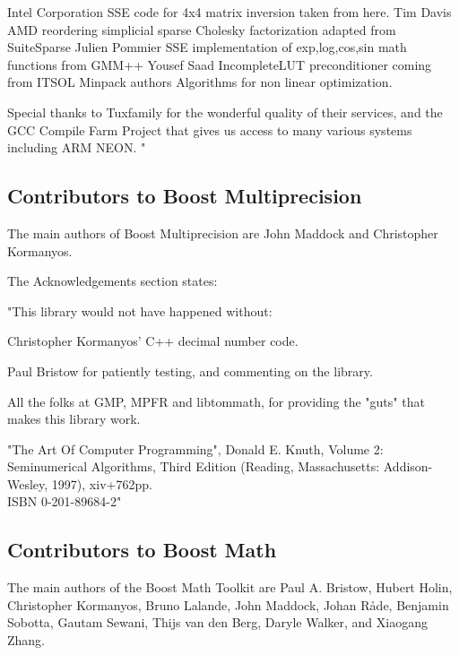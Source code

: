 \vpara
Intel Corporation  SSE code for 4x4 matrix inversion taken from here.  
Tim Davis  AMD reordering simplicial sparse Cholesky factorization adapted from SuiteSparse  
Julien Pommier  SSE implementation of exp,log,cos,sin math functions from GMM++  
Yousef Saad  IncompleteLUT preconditioner coming from ITSOL  
Minpack authors  Algorithms for non linear optimization.  

\vpara
Special thanks to Tuxfamily for the wonderful quality of their services, and the GCC Compile Farm Project that gives us access to many various systems including ARM NEON. "


%
%
%



\subsection{Contributors to Boost Multiprecision}
\label{Contributors to Boost Multiprecision}
The main authors of Boost Multiprecision are John Maddock and Christopher Kormanyos.

\vpara
The Acknowledgements section states:

\vpara
"This library would not have happened without:

Christopher Kormanyos' C++ decimal number code.

Paul Bristow for patiently testing, and commenting on the library.

All the folks at GMP, MPFR and libtommath, for providing the "guts" that makes this library work.

"The Art Of Computer Programming", Donald E. Knuth, Volume 2: Seminumerical Algorithms, Third Edition (Reading, Massachusetts: Addison-Wesley, 1997), xiv+762pp. \\
ISBN 0-201-89684-2"



\subsection{Contributors to Boost Math}
\label{Contributors to Boost Math}
The main authors of the Boost Math Toolkit are Paul A. Bristow, Hubert Holin, Christopher Kormanyos, Bruno Lalande, John Maddock, Johan Råde, Benjamin Sobotta, Gautam
Sewani, Thijs van den Berg, Daryle Walker, and Xiaogang Zhang.

